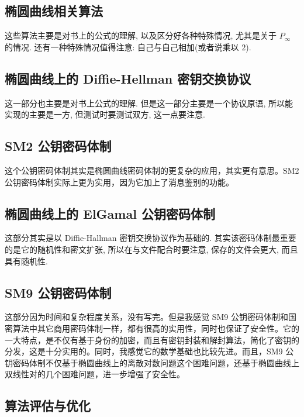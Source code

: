 \documentclass[12pt,a4paper]{article}
\begin{document}
\subsection*{椭圆曲线相关算法}

这些算法主要是对书上的公式的理解, 以及区分好各种特殊情况, 尤其是关于 $ P_{\infty} $ 的情况. 还有一种特殊情况值得注意: 自己与自己相加(或者说乘以 $ 2 $). 

\subsection*{椭圆曲线上的 Diffie-Hellman 密钥交换协议}

这一部分也主要是对书上公式的理解. 但是这一部分主要是一个协议原语, 所以能实现的主要是一方, 但测试时要测试双方, 这一点要注意. 

\subsection*{SM2 公钥密码体制}

这个公钥密码体制其实是椭圆曲线密码体制的更复杂的应用，其实更有意思。SM2 公钥密码体制实际上更为实用，因为它加上了消息鉴别的功能。

\subsection*{椭圆曲线上的 ElGamal 公钥密码体制}

这部分其实是以 Diffie-Hallman 密钥交换协议作为基础的. 其实该密码体制最重要的是它的随机性和密文扩张, 所以在与文件配合时要注意, 保存的文件会更大, 而且具有随机性. 

\subsection*{SM9 公钥密码体制}

这部分因为时间和复杂程度关系，没有写完。但是我感觉 SM9 公钥密码体制和国密算法中其它商用密码体制一样，都有很高的实用性，同时也保证了安全性。它的一大特点，是不仅有基于身份的加密，而且有密钥封装和解封算法，简化了密钥的分发，这是十分实用的。同时，我感觉它的数学基础也比较先进。而且，SM9 公钥密码体制不仅基于椭圆曲线上的离散对数问题这个困难问题，还基于椭圆曲线上双线性对的几个困难问题，进一步增强了安全性。

\subsection*{算法评估与优化}
\end{document}
